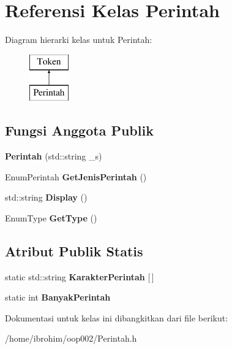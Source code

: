 \hypertarget{classPerintah}{}\section{Referensi Kelas Perintah}
\label{classPerintah}
Diagram hierarki kelas untuk Perintah\+:\begin{figure}[H]
\begin{center}
\leavevmode
\includegraphics[height=2.000000cm]{d9/de7/classPerintah}
\end{center}
\end{figure}
\subsection*{Fungsi Anggota Publik}
\begin{DoxyCompactItemize}
\item 
\hypertarget{classPerintah_a653750ef3a98a12a11b3bfb6285484c2}{}{\bfseries Perintah} (std\+::string \+\_\+s)\label{classPerintah_a653750ef3a98a12a11b3bfb6285484c2}

\item 
\hypertarget{classPerintah_aef16391fc67acc7ff74354db10eaa92a}{}Enum\+Perintah {\bfseries Get\+Jenis\+Perintah} ()\label{classPerintah_aef16391fc67acc7ff74354db10eaa92a}

\item 
\hypertarget{classPerintah_a32e0674e117dea6e1b69ea66ed885ea1}{}std\+::string {\bfseries Display} ()\label{classPerintah_a32e0674e117dea6e1b69ea66ed885ea1}

\item 
\hypertarget{classPerintah_ad2e51be1b5d590c538be4eeaecd9b110}{}Enum\+Type {\bfseries Get\+Type} ()\label{classPerintah_ad2e51be1b5d590c538be4eeaecd9b110}

\end{DoxyCompactItemize}
\subsection*{Atribut Publik Statis}
\begin{DoxyCompactItemize}
\item 
\hypertarget{classPerintah_ad52acf87f08dae5f2756e80597a925e5}{}static std\+::string {\bfseries Karakter\+Perintah} \mbox{[}$\,$\mbox{]}\label{classPerintah_ad52acf87f08dae5f2756e80597a925e5}

\item 
\hypertarget{classPerintah_afb3b32fca72ced1dd39c9083d65f721e}{}static int {\bfseries Banyak\+Perintah}\label{classPerintah_afb3b32fca72ced1dd39c9083d65f721e}

\end{DoxyCompactItemize}


Dokumentasi untuk kelas ini dibangkitkan dari file berikut\+:\begin{DoxyCompactItemize}
\item 
/home/ibrohim/oop002/Perintah.\+h\end{DoxyCompactItemize}
